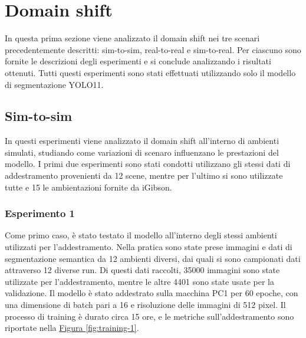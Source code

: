 \documentclass[12pt]{report}
\begin{document}
\section{Domain shift}
\label{sec:studio_domain_shift}

In questa prima sezione viene analizzato il domain shift nei tre scenari precedentemente descritti: sim-to-sim, real-to-real e sim-to-real. Per ciascuno sono fornite le descrizioni degli esperimenti e si conclude analizzando i risultati ottenuti. Tutti questi esperimenti sono stati effettuati utilizzando solo il modello di segmentazione YOLO11.

\subsection{Sim-to-sim}
\label{sec:sim_to_sim}

In questi esperimenti viene analizzato il domain shift all'interno di ambienti simulati, studiando come variazioni di scenaro influenzano le prestazioni del modello. I primi due esperimenti sono stati condotti utilizzano gli stessi dati di addestramento provenienti da 12 scene, mentre per l'ultimo si sono utilizzate tutte e 15 le ambientazioni fornite da iGibson.

\subsubsection{Esperimento 1}
\label{sec:esperimento_1}

Come primo caso, è stato testato il modello all'interno degli stessi ambienti utilizzati per l'addestramento. Nella pratica sono state prese immagini e dati di segmentazione semantica da 12 ambienti diversi, dai quali si sono campionati dati attraverso 12 diverse run. Di questi dati raccolti, 35000 immagini sono state utilizzate per l'addestramento, mentre le altre 4401 sono state usate per la validazione. Il modello è stato addestrato sulla macchina PC1 per 60 epoche, con una dimensione di batch pari a 16 e risoluzione delle immagini di 512 pixel. Il processo di training è durato circa 15 ore, e le metriche sull'addestramento sono riportate nella \hyperref[fig:training-1]{Figura \ref{fig:training-1}}.
\end{document}
